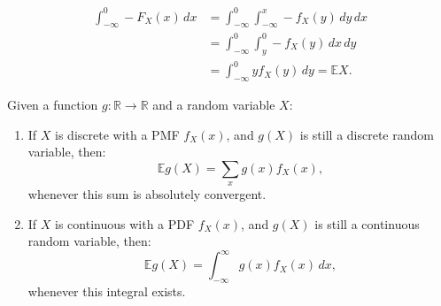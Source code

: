 \documentclass{huhtakm-template-book-v2}
\newcommand{\expect}{\mathbb{E}}
\begin{document}
    \begin{proofing}
        \begin{align*}
            \int_{-\infty}^{0}-F_{X}(x)\,dx &= \int_{-\infty}^{0}\int_{-\infty}^{x}-f_{X}(y)\,dy\,dx\\
            &= \int_{-\infty}^{0}\int_{y}^{0}-f_{X}(y)\,dx\,dy\\
            &= \int_{-\infty}^{0}yf_{X}(y)\,dy = \expect{X}.
        \end{align*}
    \end{proofing}
    \newpage

    \begin{thm}
        \label{Chapter 6 (Theorem) Expectation of Function of Random Variable}
        Given a function $g:\mathbb{R} \to \mathbb{R}$ and a random variable $X$:
        \begin{enumerate}
            \item If $X$ is discrete with a PMF $f_{X}(x)$, and $g(X)$ is still a discrete random variable, then:
            \begin{equation*}
                \expect{g(X)} = \sum_{x}g(x)f_{X}(x),
            \end{equation*}
            whenever this sum is absolutely convergent.
            \item If $X$ is continuous with a PDF $f_{X}(x)$, and $g(X)$ is still a continuous random variable, then:
            \begin{equation*}
                \expect{g(X)} = \int_{-\infty}^{\infty} g(x)f_{X}(x)\,dx,
            \end{equation*}
            whenever this integral exists.
        \end{enumerate}
    \end{thm}
\end{document}
